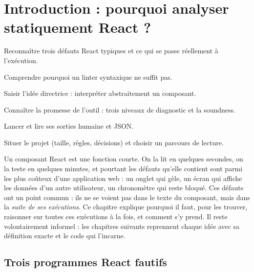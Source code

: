 \chapter{Introduction : pourquoi analyser statiquement React ?}
\label{chap:introduction}

\begin{objectifs}
  \item Reconnaître trois défauts React typiques et ce qui se passe réellement à l'exécution.
  \item Comprendre pourquoi un linter syntaxique ne suffit pas.
  \item Saisir l'idée directrice : interpréter abstraitement un composant.
  \item Connaître la promesse de l'outil : trois niveaux de diagnostic et la soundness.
  \item Lancer \reactant{} et lire ses sorties humaine et JSON.
  \item Situer le projet (taille, règles, décisions) et choisir un parcours de lecture.
\end{objectifs}


Un composant React est une fonction courte. On la lit en quelques secondes, on
la teste en quelques minutes, et pourtant les défauts qu'elle contient sont
parmi les plus coûteux d'une application web : un onglet qui gèle, un écran qui
affiche les données d'un autre utilisateur, un chronomètre qui reste bloqué.
Ces défauts ont un point commun : ils ne se voient pas dans le texte du
composant, mais dans la \emph{suite de ses exécutions}. Ce chapitre explique
pourquoi il faut, pour les trouver, raisonner sur toutes ces exécutions à la
fois, et comment \reactant{} s'y prend. Il reste volontairement informel : les
chapitres suivants reprennent chaque idée avec sa définition exacte et le code
qui l'incarne.

\section{Trois programmes React fautifs}
\label{sec:introduction-trois-bugs}

